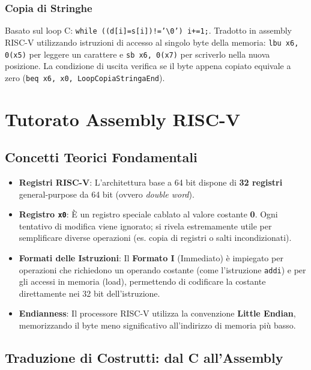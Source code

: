 \documentclass[12pt, a4paper]{article}
\begin{document}
\subsubsection{Copia di Stringhe}
Basato sul loop C: \texttt{while ((d[i]=s[i])!='\textbackslash 0') i+=1;}. Tradotto in assembly RISC-V utilizzando istruzioni di accesso al singolo byte della memoria: \texttt{lbu x6, 0(x5)} per leggere un carattere e \texttt{sb x6, 0(x7)} per scriverlo nella nuova posizione. La condizione di uscita verifica se il byte appena copiato equivale a zero (\texttt{beq x6, x0, LoopCopiaStringaEnd}).

\section{Tutorato Assembly RISC-V}

\subsection{Concetti Teorici Fondamentali}
\begin{itemize}
    \item \textbf{Registri RISC-V}: L'architettura base a 64 bit dispone di \textbf{32 registri} general-purpose da 64 bit (ovvero \textit{double word}).
    \item \textbf{Registro \texttt{x0}}: È un registro speciale cablato al valore costante \textbf{0}. Ogni tentativo di modifica viene ignorato; si rivela estremamente utile per semplificare diverse operazioni (es. copia di registri o salti incondizionati).
    \item \textbf{Formati delle Istruzioni}: Il \textbf{Formato I} (Immediato) è impiegato per operazioni che richiedono un operando costante (come l'istruzione \texttt{addi}) e per gli accessi in memoria (load), permettendo di codificare la costante direttamente nei 32 bit dell'istruzione.
    \item \textbf{Endianness}: Il processore RISC-V utilizza la convenzione \textbf{Little Endian}, memorizzando il byte meno significativo all'indirizzo di memoria più basso.
\end{itemize}

\subsection{Traduzione di Costrutti: dal C all'Assembly}
\end{document}
